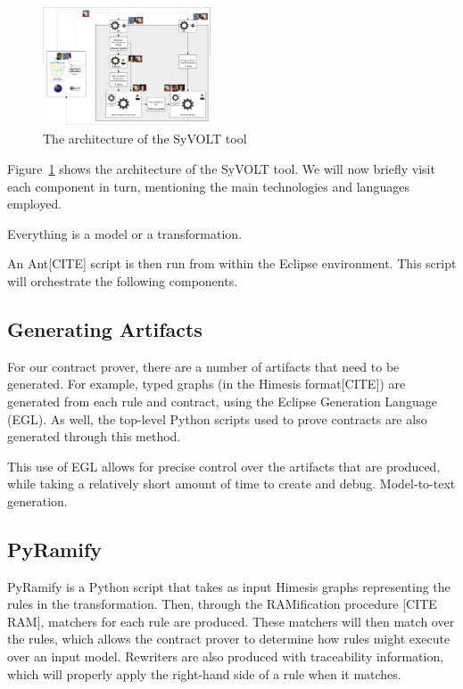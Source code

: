 \begin{figure}
\includegraphics[width=0.45\textwidth]{figures/syvolt_arch}
\caption{The architecture of the SyVOLT tool}
\label{fig:arch}
\end{figure}

Figure~\ref{fig:arch} shows the architecture of the SyVOLT tool. We will now briefly visit each component in turn, mentioning the main technologies and languages employed.

Everything is a model or a transformation.



An Ant[CITE] script is then run from within the Eclipse environment. This script will orchestrate the following components.


\subsection{Generating Artifacts}
For our contract prover, there are a number of artifacts that need to be generated. For example, typed graphs (in the Himesis format[CITE]) are generated from each rule and contract, using the Eclipse Generation Language (EGL). As well, the top-level Python scripts used to prove contracts are also generated through this method.

This use of EGL allows for precise control over the artifacts that are produced, while taking a relatively short amount of time to create and debug.
Model-to-text generation.



\subsection{PyRamify}

PyRamify is a Python script that takes as input Himesis graphs representing the rules in the transformation. Then, through the RAMification procedure [CITE RAM], matchers for each rule are produced. These matchers will then match over the rules, which allows the contract prover to determine how rules might execute over an input model. Rewriters are also produced with traceability information, which will properly apply the right-hand side of a rule when it matches.

